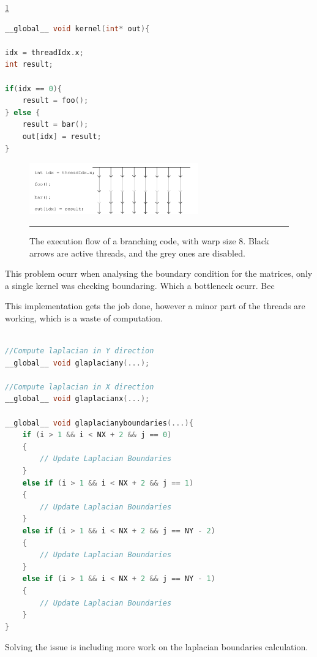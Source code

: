  \ref{fig:threads}
 
\begin{lstlisting}[language=C++, caption={CPU Vector Addition}]
__global__ void kernel(int* out){
 
idx = threadIdx.x;
int result;

if(idx == 0){
	result = foo();
} else {
	result = bar();
	out[idx] = result;
}
\end{lstlisting}

\begin{figure}[htbp]
	\centering
		\includegraphics[width=0.65\textwidth]{Figures/threads.png}
		\rule{35em}{0.2pt}
	\caption[he execution flow]{The execution flow of a branching code, with warp size 8. Black arrows are active threads, and the grey ones are disabled.
}
	\label{fig:threads}
\end{figure}


This problem ocurr when analysing the boundary condition for the matrices, only a single kernel was checking boundaring. Which a bottleneck ocurr. Bec

This implementation gets the job done, however a minor part of the threads are working, which is a waste of computation. 
\begin{lstlisting}[language=C++, caption={Evaluation of x, y, z coordinates of the Zhang and Li model in a single kernel}]

//Compute laplacian in Y direction
__global__ void glaplaciany(...);

//Compute laplacian in X direction
__global__ void glaplacianx(...);

__global__ void glaplacianyboundaries(...){
    if (i > 1 && i < NX + 2 && j == 0)
    {
     	// Update Laplacian Boundaries
    }
    else if (i > 1 && i < NX + 2 && j == 1)
    {
  		// Update Laplacian Boundaries
    }
    else if (i > 1 && i < NX + 2 && j == NY - 2)
    {
        // Update Laplacian Boundaries
    }
    else if (i > 1 && i < NX + 2 && j == NY - 1)
    {
        // Update Laplacian Boundaries
    }
}
\end{lstlisting}

Solving the issue is including more work on the laplacian boundaries calculation. 

